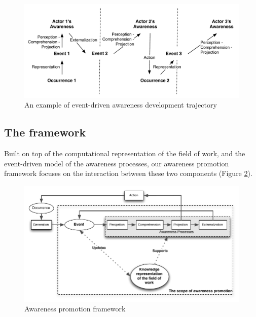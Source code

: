 \begin{figure}[htbp] %
   \centering
   \includegraphics[width=4.5in]{example_awareness_traj.pdf} 
   \caption{An example of event-driven awareness development trajectory}
   \label{fig:example_awareness_traj}
\end{figure}

\subsection{The framework} %
\label{sub:the_awareness_promotion_framework}
Built on top of the computational representation of the field of work, and the event-driven model of the awareness processes, our awareness promotion framework focuses on the interaction between these two components (Figure \ref{fig:awareness_promotion_framework}). 


\begin{figure}[htbp] %
   \centering
   \includegraphics{awareness_promotion_framework.pdf} 
   \caption{Awareness promotion framework}
   \label{fig:awareness_promotion_framework}
\end{figure}

